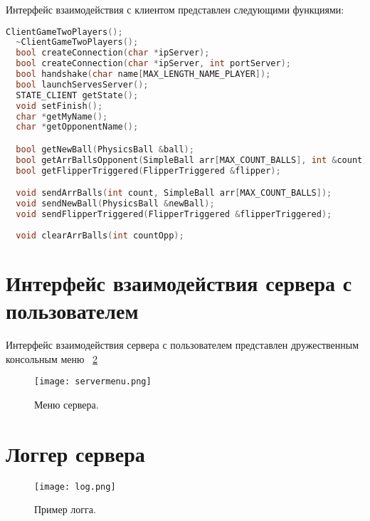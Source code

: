 Интерфейс взаимодействия с клиентом представлен следующими функциями:
\begin{lstlisting}[language=C++, caption={Интерфейс взаимодействия с клиентом},label=DescriptiveLabel]
  ClientGameTwoPlayers();
  ~ClientGameTwoPlayers();
  bool createConnection(char *ipServer);
  bool createConnection(char *ipServer, int portServer);
  bool handshake(char name[MAX_LENGTH_NAME_PLAYER]);
  bool launchServesServer();
  STATE_CLIENT getState();
  void setFinish();
  char *getMyName();
  char *getOpponentName();

  bool getNewBall(PhysicsBall &ball);
  bool getArrBallsOpponent(SimpleBall arr[MAX_COUNT_BALLS], int &count);
  bool getFlipperTriggered(FlipperTriggered &flipper);

  void sendArrBalls(int count, SimpleBall arr[MAX_COUNT_BALLS]);
  void sendNewBall(PhysicsBall &newBall);
  void sendFlipperTriggered(FlipperTriggered &flipperTriggered);
  
  void clearArrBalls(int countOpp);
\end{lstlisting}

\section{Интерфейс взаимодействия сервера с пользователем}

Интерфейс взаимодействия сервера с пользователем представлен дружественным консольным меню ~\ref{image:servermenu} 

\begin{figure}[h]
  \centering
  \texttt{[image: servermenu.png]}
  \caption{Меню сервера.}
  \label{image:servermenu}
\end{figure}

\section{Логгер сервера}



\begin{figure}[h]
  \centering
  \texttt{[image: log.png]}
  \caption{Пример логга.}
  \label{image:servermenu}
\end{figure}

